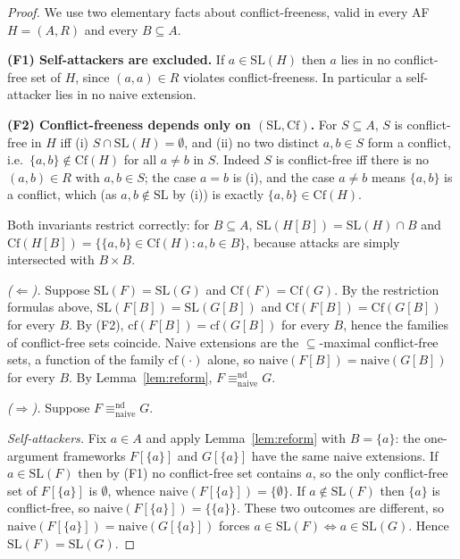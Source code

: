 \documentclass{amsart}
\theoremstyle{remark}
\begin{document}
\begin{proof}
We use two elementary facts about conflict-freeness, valid in every AF
$H=(A,R)$ and every $B\subseteq A$.

\smallskip\noindent\textbf{(F1) Self-attackers are excluded.}
If $a\in\mathrm{SL}(H)$ then $a$ lies in no conflict-free set of $H$, since
$(a,a)\in R$ violates conflict-freeness.  In particular a self-attacker lies in
no naive extension.

\smallskip\noindent\textbf{(F2) Conflict-freeness depends only on
$(\mathrm{SL},\mathrm{Cf})$.}
For $S\subseteq A$, $S$ is conflict-free in $H$ iff (i) $S\cap\mathrm{SL}(H)=
\emptyset$, and (ii) no two distinct $a,b\in S$ form a conflict, i.e.\ $\{a,b\}
\notin\mathrm{Cf}(H)$ for all $a\neq b$ in $S$.  Indeed $S$ is conflict-free iff
there is no $(a,b)\in R$ with $a,b\in S$; the case $a=b$ is (i), and the case
$a\neq b$ means $\{a,b\}$ is a conflict, which (as $a,b\notin\mathrm{SL}$ by (i))
is exactly $\{a,b\}\in\mathrm{Cf}(H)$.

Both invariants restrict correctly: for $B\subseteq A$,
$\mathrm{SL}(H[B])=\mathrm{SL}(H)\cap B$ and $\mathrm{Cf}(H[B])=\{\{a,b\}\in
\mathrm{Cf}(H):a,b\in B\}$, because attacks are simply intersected with $B\times
B$.

\smallskip
\emph{($\Leftarrow$).}  Suppose $\mathrm{SL}(F)=\mathrm{SL}(G)$ and
$\mathrm{Cf}(F)=\mathrm{Cf}(G)$.  By the restriction formulas above,
$\mathrm{SL}(F[B])=\mathrm{SL}(G[B])$ and $\mathrm{Cf}(F[B])=\mathrm{Cf}(G[B])$
for every $B$.  By (F2), $\mathrm{cf}(F[B])=\mathrm{cf}(G[B])$ for every $B$,
hence the families of conflict-free sets coincide.  Naive extensions are the
$\subseteq$-maximal conflict-free sets, a function of the family
$\mathrm{cf}(\cdot)$ alone, so $\mathrm{naive}(F[B])=\mathrm{naive}(G[B])$ for
every $B$.  By Lemma~\ref{lem:reform}, $F\equiv^{\mathrm{nd}}_{\mathrm{naive}}G$.

\smallskip
\emph{($\Rightarrow$).}  Suppose $F\equiv^{\mathrm{nd}}_{\mathrm{naive}}G$.

\emph{Self-attackers.}  Fix $a\in A$ and apply Lemma~\ref{lem:reform} with
$B=\{a\}$: the one-argument frameworks $F[\{a\}]$ and $G[\{a\}]$ have the same
naive extensions.  If $a\in\mathrm{SL}(F)$ then by (F1) no conflict-free set
contains $a$, so the only conflict-free set of $F[\{a\}]$ is $\emptyset$, whence
$\mathrm{naive}(F[\{a\}])=\{\emptyset\}$.  If $a\notin\mathrm{SL}(F)$ then
$\{a\}$ is conflict-free, so $\mathrm{naive}(F[\{a\}])=\{\{a\}\}$.  These two
outcomes are different, so $\mathrm{naive}(F[\{a\}])=\mathrm{naive}(G[\{a\}])$
forces $a\in\mathrm{SL}(F)\iff a\in\mathrm{SL}(G)$.  Hence
$\mathrm{SL}(F)=\mathrm{SL}(G)$.


\end{proof}
\end{document}
